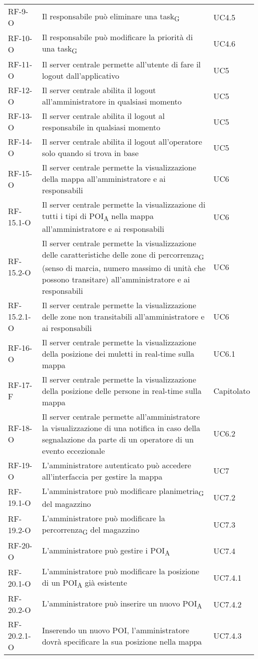 \begin{longtable}{ 
		>{}p{} 
		>{}p{}
		>{\centering}p{} }
RF-9-O		&	Il responsabile può eliminare una \gls{task}\textsubscript{G} 	&	UC4.5\tabularnewline
RF-10-O		&	Il responsabile può modificare la priorità di una \gls{task}\textsubscript{G} 	&	UC4.6\tabularnewline				
RF-11-O		&	Il server centrale permette all'utente di fare il logout dall'applicativo	&	UC5\tabularnewline
RF-12-O		&	Il server centrale abilita il logout all'amministratore in qualsiasi momento	&	UC5\tabularnewline
RF-13-O		&	Il server centrale abilita il logout al responsabile in qualsiasi momento	&	UC5\tabularnewline
RF-14-O		&	Il server centrale abilita il logout all'operatore solo quando si trova in base 	&	UC5\tabularnewline				
RF-15-O		&	Il server centrale permette la visualizzazione della mappa all'amministratore e ai responsabili	&	UC6\tabularnewline
RF-15.1-O		&	Il server centrale permette la visualizzazione di tutti i tipi di \acrshort{POI}\textsubscript{A} nella mappa all'amministratore e ai responsabili	&	UC6\tabularnewline
RF-15.2-O		&	Il server centrale permette la visualizzazione delle caratteristiche delle zone di \gls{percorrenza}\textsubscript{G} (senso di marcia, numero massimo di unità che possono transitare) all'amministratore e ai responsabili	& UC6\tabularnewline
RF-15.2.1-O	&	Il server centrale permette la visualizzazione delle zone non transitabili all'amministratore e ai responsabili	&	UC6 \tabularnewline
RF-16-O		&	Il server centrale permette la visualizzazione della posizione dei muletti in real-time sulla mappa	&	UC6.1\tabularnewline
RF-17-F		&	Il server centrale permette la visualizzazione della posizione delle persone in real-time sulla mappa	&	Capitolato\tabularnewline
RF-18-O		&	Il server centrale permette all'amministratore la visualizzazione di una notifica in caso della segnalazione da parte di un operatore di un evento eccezionale	&	UC6.2\tabularnewline				
RF-19-O		&	L'amministratore autenticato può accedere all'interfaccia per gestire la mappa 	&	UC7\tabularnewline
RF-19.1-O		&	L'amministratore può modificare \gls{planimetria}\textsubscript{G} del magazzino	&	UC7.2\tabularnewline
RF-19.2-O		&	L'amministratore può modificare la \gls{percorrenza}\textsubscript{G} del magazzino	&	UC7.3\tabularnewline
RF-20-O		&	L'amministratore può gestire i \acrshort{POI}\textsubscript{A}	&	UC7.4\tabularnewline
RF-20.1-O		&	L'amministratore può modificare la posizione di un \acrshort{POI}\textsubscript{A} già esistente	&	UC7.4.1\tabularnewline
RF-20.2-O		&	L'amministratore può inserire un nuovo \acrshort{POI}\textsubscript{A}	&	UC7.4.2\tabularnewline
RF-20.2.1-O	&	Inserendo un nuovo POI, l'amministratore dovrà specificare la sua posizione nella mappa	&	UC7.4.3\tabularnewline

\end{longtable}
